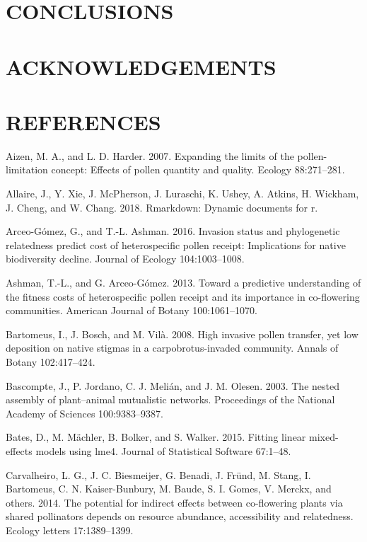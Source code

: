 \documentclass[11pt,a4paper]{article}
\begin{document}
\section{CONCLUSIONS}\label{conclusions}

\section{ACKNOWLEDGEMENTS}\label{acknowledgements}

\section{REFERENCES}\label{references}

\hypertarget{refs}{}
\hypertarget{ref-aizen2007}{}
Aizen, M. A., and L. D. Harder. 2007. Expanding the limits of the
pollen-limitation concept: Effects of pollen quantity and quality.
Ecology 88:271--281.

\hypertarget{ref-Allaire_2018}{}
Allaire, J., Y. Xie, J. McPherson, J. Luraschi, K. Ushey, A. Atkins, H.
Wickham, J. Cheng, and W. Chang. 2018. Rmarkdown: Dynamic documents for
r.

\hypertarget{ref-arceo2016}{}
Arceo-Gómez, G., and T.-L. Ashman. 2016. Invasion status and
phylogenetic relatedness predict cost of heterospecific pollen receipt:
Implications for native biodiversity decline. Journal of Ecology
104:1003--1008.

\hypertarget{ref-ashman2013}{}
Ashman, T.-L., and G. Arceo-Gómez. 2013. Toward a predictive
understanding of the fitness costs of heterospecific pollen receipt and
its importance in co-flowering communities. American Journal of Botany
100:1061--1070.

\hypertarget{ref-bartomeus2008}{}
Bartomeus, I., J. Bosch, and M. Vilà. 2008. High invasive pollen
transfer, yet low deposition on native stigmas in a carpobrotus-invaded
community. Annals of Botany 102:417--424.

\hypertarget{ref-bascompte2003}{}
Bascompte, J., P. Jordano, C. J. Melián, and J. M. Olesen. 2003. The
nested assembly of plant--animal mutualistic networks. Proceedings of
the National Academy of Sciences 100:9383--9387.

\hypertarget{ref-Bates_2015}{}
Bates, D., M. Mächler, B. Bolker, and S. Walker. 2015. Fitting linear
mixed-effects models using lme4. Journal of Statistical Software
67:1--48.

\hypertarget{ref-carvalheiro2014}{}
Carvalheiro, L. G., J. C. Biesmeijer, G. Benadi, J. Fründ, M. Stang, I.
Bartomeus, C. N. Kaiser-Bunbury, M. Baude, S. I. Gomes, V. Merckx, and
others. 2014. The potential for indirect effects between co-flowering
plants via shared pollinators depends on resource abundance,
accessibility and relatedness. Ecology letters 17:1389--1399.
\end{document}
